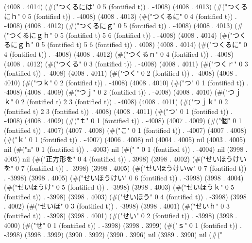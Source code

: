 (4008 . 4014) (#("つくるには" 0 5 (fontified t)) . -4008) (4008 . 4013) (#("つくるにｈ" 0 5 (fontified t)) . -4008) (4008 . 4013) (#("つくるに" 0 4 (fontified t)) . -4008) (4008 . 4012) (#("つくるにｇ" 0 5 (fontified t)) . -4008) (4008 . 4013) (#("つくるにｇｈ" 0 5 (fontified t) 5 6 (fontified t)) . -4008) (4008 . 4014) (#("つくるにｇｈ" 0 5 (fontified t) 5 6 (fontified t)) . 4008) (4008 . 4014) (#("つくるに" 0 4 (fontified t)) . -4008) (4008 . 4012) (#("つくるｎ" 0 4 (fontified t)) . -4008) (4008 . 4012) (#("つくる" 0 3 (fontified t)) . -4008) (4008 . 4011) (#("つくｒ" 0 3 (fontified t)) . -4008) (4008 . 4011) (#("つく" 0 2 (fontified t)) . -4008) (4008 . 4010) (#("つｋ" 0 2 (fontified t)) . -4008) (4008 . 4010) (#("つ" 0 1 (fontified t)) . -4008) (4008 . 4009) (#("つｊ" 0 2 (fontified t)) . -4008) (4008 . 4010) (#("つｊｋ" 0 2 (fontified t) 2 3 (fontified t)) . -4008) (4008 . 4011) (#("つｊｋ" 0 2 (fontified t) 2 3 (fontified t)) . 4008) (4008 . 4011) (#("つ" 0 1 (fontified t)) . -4008) (4008 . 4009) (#("ｔ" 0 1 (fontified t)) . -4008) (4007 . 4009) (#("個" 0 1 (fontified t)) . 4007) (4007 . 4008) (#("こ" 0 1 (fontified t)) . -4007) (4007 . 4008) (#("ｋ" 0 1 (fontified t)) . -4007) (4006 . 4008) nil (4004 . 4005) nil (4003 . 4005) nil (#("n" 0 1 (fontified t)) . -4003) nil (#(" " 0 1 (fontified t)) . -4004) nil (3998 . 4005) nil (#("正方形を" 0 4 (fontified t)) . 3998) (3998 . 4002) (#("せいほうけいを" 0 7 (fontified t)) . -3998) (3998 . 4005) (#("せいほうけいｗ" 0 7 (fontified t)) . -3998) (3998 . 4005) (#("せいほうけい" 0 6 (fontified t)) . -3998) (3998 . 4004) (#("せいほうけ" 0 5 (fontified t)) . -3998) (3998 . 4003) (#("せいほうｋ" 0 5 (fontified t)) . -3998) (3998 . 4003) (#("せいほう" 0 4 (fontified t)) . -3998) (3998 . 4002) (#("せいほ" 0 3 (fontified t)) . -3998) (3998 . 4001) (#("せいｈ" 0 3 (fontified t)) . -3998) (3998 . 4001) (#("せい" 0 2 (fontified t)) . -3998) (3998 . 4000) (#("せ" 0 1 (fontified t)) . -3998) (3998 . 3999) (#("ｓ" 0 1 (fontified t)) . -3998) (3998 . 3999) (3990 . 3992) (3990 . 3996) nil (3989 . 3990) nil (#("
